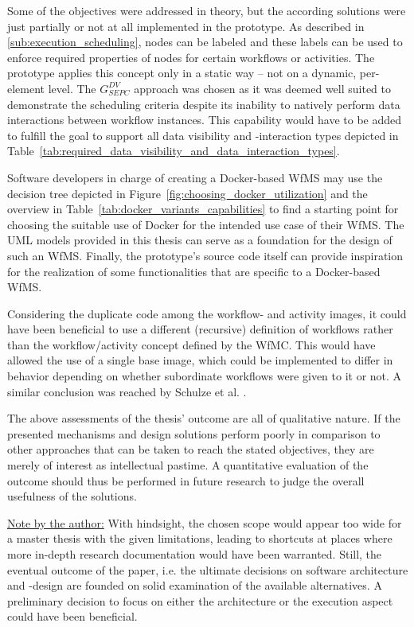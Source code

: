   Some of the objectives were addressed in theory, but the according solutions were just partially or not at all implemented in the prototype.
  As described in \ref{sub:execution_scheduling}, nodes can be labeled and these labels can be used to enforce required properties of nodes for certain workflows or activities.
  The prototype applies this concept only in a static way -- not on a dynamic, per-element level.
  The $G_{SEPC}^{DV}$ approach was chosen as it was deemed well suited to demonstrate the scheduling criteria despite its inability to natively perform data interactions between workflow instances. This capability would have to be added to fulfill the goal to support all data visibility and -interaction types depicted in Table~\ref{tab:required_data_visibility_and_data_interaction_types}.

  Software developers in charge of creating a Docker-based \ac{WfMS} may use the decision tree depicted in Figure~\ref{fig:choosing_docker_utilization} and the overview in Table~\ref{tab:docker_variants_capabilities} to find a starting point for choosing the suitable use of Docker for the intended use case of their \ac{WfMS}. The UML models provided in this thesis can serve as a foundation for the design of such an \ac{WfMS}. Finally, the prototype's source code itself can provide inspiration for the realization of some functionalities that are specific to a Docker-based \ac{WfMS}.

  Considering the duplicate code among the workflow- and activity images, it could have been beneficial to use a different (recursive) definition of workflows rather than the workflow/activity concept defined by the \ac{WfMC}. This would have allowed the use of a single base image, which could be implemented to differ in behavior depending on whether subordinate workflows were given to it or not. A similar conclusion was reached by Schulze et al. \cite[p.~119]{Schulze1998Services}.

  The above assessments of the thesis' outcome are all of qualitative nature. If the presented mechanisms and design solutions perform poorly in comparison to other approaches that can be taken to reach the stated objectives, they are merely of interest as intellectual pastime. A quantitative evaluation of the outcome should thus be performed in future research to judge the overall usefulness of the solutions.

  \underline{Note by the author:} With hindsight, the chosen scope would appear too wide for a master thesis with the given limitations, leading to shortcuts at places where more in-depth research documentation would have been warranted. Still, the eventual outcome of the paper, i.e. the ultimate decisions on software architecture and -design are founded on solid examination of the available alternatives. A preliminary decision to focus on either the architecture or the execution aspect could have been beneficial.

